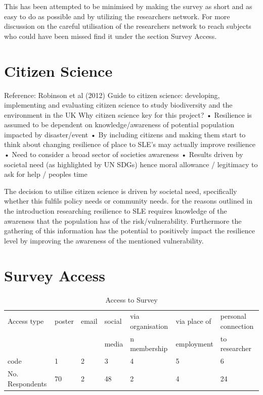 This has been attempted to be minimised by making the survey as short and as easy to do as possible and by utilizing the researchers network. For more discussion on the careful utilisation of the researchers network to reach subjects who could have been missed find it under the section Survey Access. 

\section{Citizen Science}
Reference: Robinson et al (2012) Guide to citizen science: developing, implementing and evaluating citizen science to study biodiversity and the environment in the UK 
Why citizen science key for this project?
•	Resilience is assumed to be dependent on knowledge/awareness of potential population impacted by disaster/event
•	By including citizens and making them start to think about changing resilience of place to SLE’s may actually improve resilience
•	Need to consider a broad sector of societies awareness
•	Results driven by societal need (as highlighted by UN SDGs) hence moral allowance / legitimacy to ask for help / peoples time

The decision to utilise citizen science is driven by societal need, specifically whether this fulfils policy needs or community needs. for the reasons outlined in the introduction researching resilience to SLE requires knowledge of the awareness that the population has of the risk/vulnerability. Furthermore the gathering of this information has the potential to positively impact the resilience level by improving the awareness of the mentioned vulnerability. 

\section{Survey Access}

\begin{table}[!ht]
    \centering
    \begin{tabular}{|l|l|l|l|l|l|l|}
    \hline
     Access type & poster & email & social & via organisation  & via place of  & personal connection \\ \newline
       &  & & media & n membership & employment & to researcher \\ \hline
       code & 1 & 2 & 3 & 4 & 5 & 6 \\ \hline
      No. Respondents & 70 & 2 & 48 & 2 & 4 & 24 \\ \hline
    \end{tabular}
      \caption{Access to Survey}
      \label{access_survey}
\end{table}


